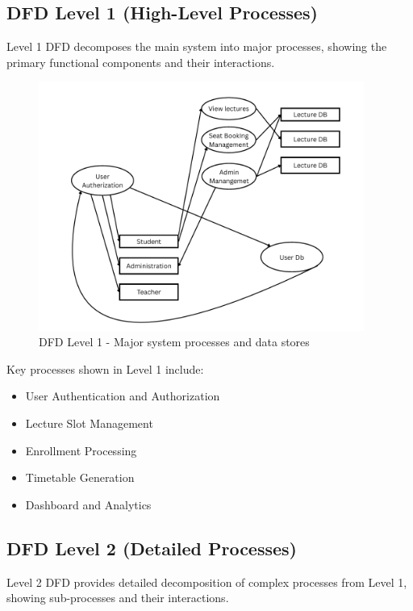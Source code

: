 \subsection{DFD Level 1 (High-Level Processes)}

Level 1 DFD decomposes the main system into major processes, showing the primary functional components and their interactions.

\begin{figure}[h]
    \centering
    \includegraphics[width=0.95\textwidth]{images/DFD Level 1.png}
    \caption{DFD Level 1 - Major system processes and data stores}
    \label{fig:dfd1}
\end{figure}

Key processes shown in Level 1 include:
\begin{itemize}[leftmargin=*]
    \item User Authentication and Authorization
    \item Lecture Slot Management
    \item Enrollment Processing
    \item Timetable Generation
    \item Dashboard and Analytics
\end{itemize}

\subsection{DFD Level 2 (Detailed Processes)}

Level 2 DFD provides detailed decomposition of complex processes from Level 1, showing sub-processes and their interactions.

